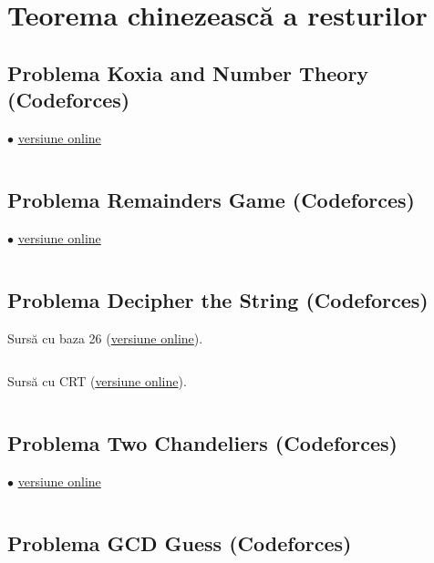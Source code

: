 \documentclass[../main.tex]{subfiles}
\begin{document}
\chapter{Teorema chinezească a resturilor}

\section{Problema Koxia and Number Theory (Codeforces)}
\label{code:koxia-and-number-theory}
$\bullet$
\href{https://codeforces.com/contest/1770/submission/235631297}{versiune online}

\inputminted{cpp}{../src/math/koxia-and-number-theory.cpp}

\section{Problema Remainders Game (Codeforces)}
\label{code:remainders-game}
$\bullet$
\href{https://codeforces.com/contest/687/submission/289887028}{versiune online}

\inputminted{cpp}{../src/math/remainders-game.cpp}

\section{Problema Decipher the String (Codeforces)}
\label{code:decipher-the-string}

Sursă cu baza 26 (\href{https://codeforces.com/contest/1117/submission/285800861}{versiune online}).

\inputminted{cpp}{../src/math/decipher-the-string-1.cpp}

Sursă cu CRT (\href{https://codeforces.com/contest/1117/submission/285816588}{versiune online}).

\inputminted{cpp}{../src/math/decipher-the-string-2.cpp}

\section{Problema Two Chandeliers (Codeforces)}
\label{code:two-chandeliers}
$\bullet$
\href{https://codeforces.com/contest/1500/submission/286177128}{versiune online}

\inputminted{cpp}{../src/math/two-chandeliers.cpp}

\section{Problema GCD Guess (Codeforces)}
\label{code:gcd-guess}
\end{document}
